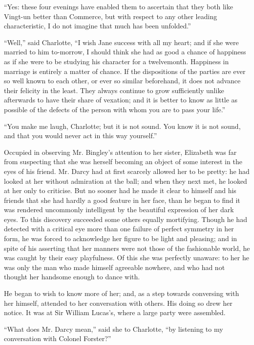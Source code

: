 \documentclass[12pt,openright]{book}
\begin{document}
“Yes: these four evenings have enabled them to ascertain that they both like Vingt-un better than Commerce, but with respect to any other leading characteristic, I do not imagine that much has been unfolded.”

“Well,” said Charlotte, “I wish Jane success with all my heart; and if she were married to him to-morrow, I should think she had as good a chance of happiness as if she were to be studying his character for a twelvemonth. Happiness in marriage is entirely a matter of chance. If the dispositions of the parties are ever so well known to each other, or ever so similar beforehand, it does not advance their felicity in the least. They always continue to grow sufficiently unlike afterwards to have their share of vexation; and it is better to know as little as possible of the defects of the person with whom you are to pass your life.”

“You make me laugh, Charlotte; but it is not sound. You know it is not sound, and that you would never act in this way yourself.”

Occupied in observing Mr. Bingley’s attention to her sister, Elizabeth was far from suspecting that she was herself becoming an object of some interest in the eyes of his friend. Mr. Darcy had at first scarcely allowed her to be pretty: he had looked at her without admiration at the ball; and when they next met, he looked at her only to criticise. But no sooner had he made it clear to himself and his friends that she had hardly a good feature in her face, than he began to find it was rendered uncommonly intelligent by the beautiful expression of her dark eyes. To this discovery succeeded some others equally mortifying. Though he had detected with a critical eye more than one failure of perfect symmetry in her form, he was forced to acknowledge her figure to be light and pleasing; and in spite of his asserting that her manners were not those of the fashionable world, he was caught by their easy playfulness. Of this she was perfectly unaware: to her he was only the man who made himself agreeable nowhere, and who had not thought her handsome enough to dance with.

He began to wish to know more of her; and, as a step towards conversing with her himself, attended to her conversation with others. His doing so drew her notice. It was at Sir William Lucas’s, where a large party were assembled.

“What does Mr. Darcy mean,” said she to Charlotte, “by listening to my conversation with Colonel Forster?”
\end{document}
